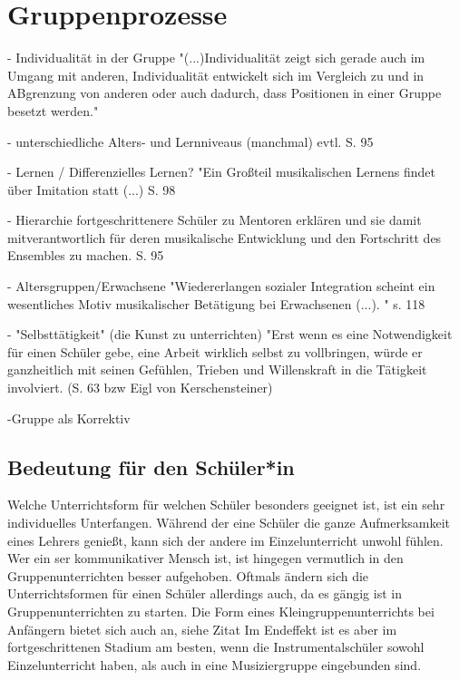 \section{Gruppenprozesse}


- Individualität in der Gruppe 
"(...)Individualität zeigt sich gerade auch im Umgang mit anderen,
Individualität entwickelt sich im Vergleich zu und in ABgrenzung von anderen
oder auch dadurch, dass Positionen in einer Gruppe besetzt werden."

- unterschiedliche Alters- und Lernniveaus (manchmal) evtl. S. 95

- Lernen / Differenzielles Lernen? 
"Ein Großteil musikalischen Lernens findet über Imitation statt (...) S. 98

- Hierarchie
fortgeschrittenere Schüler zu Mentoren erklären und sie damit mitverantwortlich
für deren musikalische Entwicklung und den Fortschritt des Ensembles zu machen.
S. 95

- Altersgruppen/Erwachsene
"Wiedererlangen sozialer Integration scheint ein wesentliches Motiv
musikalischer Betätigung bei Erwachsenen (...). " s. 118

- "Selbsttätigkeit" (die Kunst zu unterrichten)
"Erst wenn es eine Notwendigkeit für einen Schüler gebe, eine Arbeit wirklich
selbst zu vollbringen, würde er ganzheitlich mit seinen Gefühlen, Trieben und
Willenskraft in die Tätigkeit involviert. (S. 63 bzw Eigl von Kerschensteiner)

-Gruppe als Korrektiv

\subsection*{Bedeutung für den Schüler*in}

Welche Unterrichtsform für welchen Schüler besonders geeignet ist, ist ein sehr
individuelles Unterfangen. Während der eine Schüler die ganze Aufmerksamkeit
eines Lehrers genießt, kann sich der andere im Einzelunterricht unwohl fühlen.
Wer ein ser kommunikativer Mensch ist, ist hingegen vermutlich in den
Gruppenunterrichten besser aufgehoben. Oftmals ändern sich die Unterrichtsformen
für einen Schüler allerdings auch, da es gängig ist in Gruppenunterrichten zu
starten. Die Form eines Kleingruppenunterrichts bei Anfängern bietet sich auch
an, siehe Zitat \autocite[220]{Busch:grundwissen_Instrumentalpädagogik}
Im Endeffekt ist es aber im fortgeschrittenen Stadium am besten, wenn die
Instrumentalschüler sowohl Einzelunterricht haben, als auch in eine
Musiziergruppe eingebunden sind. 

